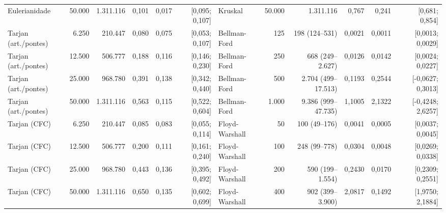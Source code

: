 \begin{table}[t]
\begin{tabular}{@{}lrrrrr@{\hspace{0.8em}}lrrrrr@{}}
Eulerianidade & 50.000 & 1.311.116 & 0{,}101 & 0{,}017 & [0{,}095; 0{,}107] & Kruskal & 50.000 & 1.311.116 & 0{,}767 & 0{,}241 & [0{,}681; 0{,}854] \\
Tarjan (art./pontes) & 6.250 & 210.447 & 0{,}080 & 0{,}075 & [0{,}053; 0{,}107] & Bellman-Ford & 125 & 198 (124--531) & 0{,}0021 & 0{,}0011 & [0{,}0013; 0{,}0029] \\
Tarjan (art./pontes) & 12.500 & 506.777 & 0{,}188 & 0{,}116 & [0{,}146; 0{,}230] & Bellman-Ford & 250 & 668 (249--2.627) & 0{,}0126 & 0{,}0142 & [0{,}0024; 0{,}0227] \\
Tarjan (art./pontes) & 25.000 & 968.780 & 0{,}391 & 0{,}138 & [0{,}342; 0{,}440] & Bellman-Ford & 500 & 2.704 (499--17.513) & 0{,}1193 & 0{,}2544 & [-0{,}0627; 0{,}3013] \\
Tarjan (art./pontes) & 50.000 & 1.311.116 & 0{,}563 & 0{,}115 & [0{,}522; 0{,}604] & Bellman-Ford & 1.000 & 9.386 (999--47.735) & 1{,}1005 & 2{,}1322 & [-0{,}4248; 2{,}6257] \\
Tarjan (CFC) & 6.250 & 210.447 & 0{,}085 & 0{,}083 & [0{,}055; 0{,}114] & Floyd-Warshall & 50 & 100 (49--176) & 0{,}0041 & 0{,}0005 & [0{,}0037; 0{,}0045] \\
Tarjan (CFC) & 12.500 & 506.777 & 0{,}200 & 0{,}111 & [0{,}161; 0{,}240] & Floyd-Warshall & 100 & 248 (99--778) & 0{,}0304 & 0{,}0048 & [0{,}0269; 0{,}0338] \\
Tarjan (CFC) & 25.000 & 968.780 & 0{,}443 & 0{,}136 & [0{,}395; 0{,}492] & Floyd-Warshall & 200 & 590 (199--1.554) & 0{,}2430 & 0{,}0170 & [0{,}2309; 0{,}2551] \\
Tarjan (CFC) & 50.000 & 1.311.116 & 0{,}650 & 0{,}135 & [0{,}602; 0{,}699] & Floyd-Warshall & 400 & 902 (399--3.900) & 2{,}0817 & 0{,}1492 & [1{,}9750; 2{,}1884] \\
\bottomrule
\end{tabular}
\end{table}
